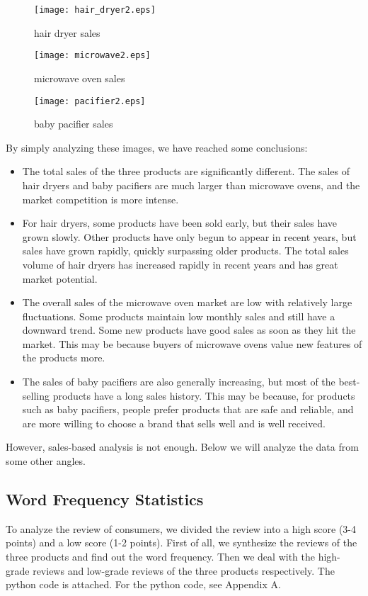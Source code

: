 \documentclass{mcmthesis}
\begin{document}
	\begin{figure}[H]
		\small
		\centering
		\texttt{[image: hair\_dryer2.eps]}
		\caption{hair dryer sales} \label{hair dryer sales}
	\end{figure}
	
	\begin{figure}[H]
		\small
		\centering
		\texttt{[image: microwave2.eps]}
		\caption{microwave  oven sales} \label{microwave sales}
	\end{figure}
	
	\begin{figure}[H]
		\small
		\centering
		\texttt{[image: pacifier2.eps]}
		\caption{baby pacifier sales} \label{pacifier sales}
	\end{figure}
	
	By simply analyzing these images, we have reached some conclusions:
	\begin{itemize}
		\item
		The total sales of the three products are significantly different. The sales of hair dryers and baby pacifiers are much larger than microwave ovens, and the market competition is more intense.
		\item
		For hair dryers, some products have been sold early, but their sales have grown slowly. Other products have only begun to appear in recent years, but sales have grown rapidly, quickly surpassing older products. The total sales volume of hair dryers has increased rapidly in recent years and has great market potential.
		\item
		The overall sales of the microwave oven market are low with relatively large fluctuations. Some products maintain low monthly sales and still have a downward trend. Some new products have good sales as soon as they hit the market. This may be because buyers of microwave ovens value new features of the products more.
		\item
		
		The sales of baby pacifiers are also generally increasing, but most of the best-selling products have a long sales history. This may be because, for products such as baby pacifiers, people prefer products that are safe and reliable, and are more willing to choose a brand that sells well and is well received.
	\end{itemize}
	
	However, sales-based analysis is not enough. Below we will analyze the data from some other angles.
	
	\subsection{Word Frequency Statistics}
	To analyze the review of consumers, we divided the review into a high score (3-4 points) and a low score (1-2 points). First of all, we synthesize the reviews of the three products and find out the word frequency. Then we deal with the high-grade reviews and low-grade reviews of the three products respectively. The python code is attached. For the python code, see Appendix A.
\end{document}
